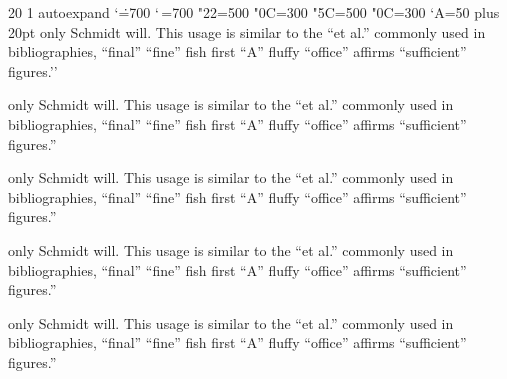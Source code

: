  
  \pdffontexpand{} 20 1 autoexpand
\rpcode\tenrm`\.=700 \rpcode\tenrm`\,=700 \rpcode\tenrm"22=500 \rpcode\tenrm"0C=300
\lpcode\tenrm"5C=500 \lpcode\tenrm"0C=300 \lpcode\tenrm`A=50
  \parfillskip=0pt plus 20pt
\def\t{only Schmidt will.  This usage is similar to the ``et al.'' commonly used in bibliographies, ``final'' ``fine'' fish
  first ``A'' fluffy ``office'' affirms ``sufficient'' figures.''\par}
\hsize=150pt \t \hsize=180pt \t \hsize=200pt \t \hsize=230pt \t \hsize=260pt \t
\bye
